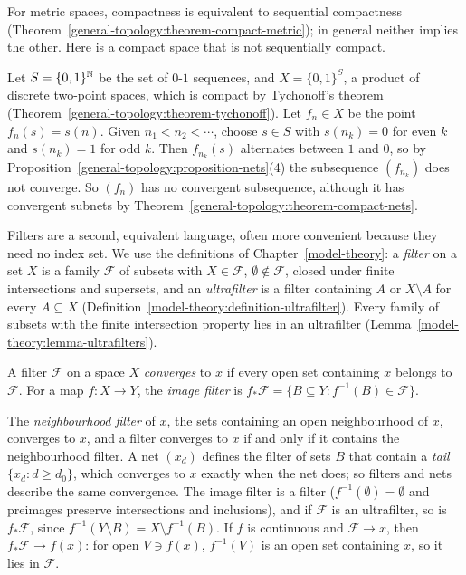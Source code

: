 For metric spaces, compactness is equivalent to sequential compactness (Theorem~\ref{general-topology:theorem-compact-metric}); in general neither implies the other. Here is a compact space that is not
sequentially compact.

\begin{example}\label{general-topology:example-not-sequentially-compact}
Let $S = \{0, 1\}^{\mathbb{N}}$ be the set of $0$-$1$ sequences, and $X = \{0, 1\}^S$, a product of discrete two-point spaces, which is compact by Tychonoff's theorem
(Theorem~\ref{general-topology:theorem-tychonoff}). Let $f_n \in X$ be the point $f_n(s) = s(n)$. Given $n_1 < n_2 < \cdots$, choose $s \in S$ with $s(n_k) = 0$ for even $k$ and $s(n_k) = 1$ for odd $k$.
Then $f_{n_k}(s)$ alternates between $1$ and $0$, so by Proposition~\ref{general-topology:proposition-nets}(4) the subsequence $(f_{n_k})$ does not converge. So $(f_n)$ has no convergent subsequence, although it has
convergent subnets by Theorem~\ref{general-topology:theorem-compact-nets}.
\end{example}

Filters are a second, equivalent language, often more convenient because they need no index set. We use the definitions of Chapter~\ref{model-theory}: a \emph{filter} on a set $X$ is a family $\mathcal{F}$ of
subsets with $X \in \mathcal{F}$, $\emptyset \notin \mathcal{F}$, closed under finite intersections and supersets, and an \emph{ultrafilter} is a filter containing $A$ or $X \setminus A$ for every
$A \subseteq X$ (Definition~\ref{model-theory:definition-ultrafilter}). Every family of subsets with the finite intersection property lies in an ultrafilter
(Lemma~\ref{model-theory:lemma-ultrafilters}).

\begin{definition}\label{general-topology:definition-filter-convergence}
A filter $\mathcal{F}$ on a space $X$ \emph{converges} to $x$ if every open set containing $x$ belongs to $\mathcal{F}$. For a map $f \colon X \to Y$, the \emph{image filter} is
$f_*\mathcal{F} = \{B \subseteq Y : f^{-1}(B) \in \mathcal{F}\}$.
\end{definition}

The \emph{neighbourhood filter} of $x$, the sets containing an open neighbourhood of $x$, converges to $x$, and a filter converges to $x$ if and only if it contains the neighbourhood filter. A net $(x_d)$
defines the filter of sets $B$ that contain a \emph{tail} $\{x_d : d \geq d_0\}$, which converges to $x$ exactly when the net does; so filters and nets describe the same convergence. The image filter is a
filter ($f^{-1}(\emptyset) = \emptyset$ and preimages preserve intersections and inclusions), and if $\mathcal{F}$ is an ultrafilter, so is $f_*\mathcal{F}$, since $f^{-1}(Y \setminus B) = X \setminus f^{-1}(B)$.
If $f$ is continuous and $\mathcal{F} \to x$, then $f_*\mathcal{F} \to f(x)$: for open $V \ni f(x)$, $f^{-1}(V)$ is an open set containing $x$, so it lies in $\mathcal{F}$.


